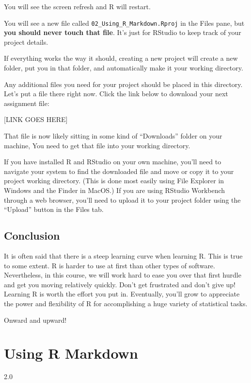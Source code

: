 \documentclass[
]{book}
\begin{document}
You will see the screen refresh and R will restart.

You will see a new file called \texttt{02\_Using\_R\_Markdown.Rproj} in the Files pane, but \textbf{you should never touch that file}. It's just for RStudio to keep track of your project details.

If everything works the way it should, creating a new project will create a new folder, put you in that folder, and automatically make it your working directory.

Any additional files you need for your project should be placed in this directory. Let's put a file there right now. Click the link below to download your next assignment file:

{[}LINK GOES HERE{]}

That file is now likely sitting in some kind of ``Downloads'' folder on your machine, You need to get that file into your working directory.

If you have installed R and RStudio on your own machine, you'll need to navigate your system to find the downloaded file and move or copy it to your project working directory. (This is done most easily using File Explorer in Windows and the Finder in MacOS.) If you are using RStudio Workbench through a web browser, you'll need to upload it to your project folder using the ``Upload'' button in the Files tab.

\hypertarget{intror-conclusion}{%
\section{Conclusion}\label{intror-conclusion}}

It is often said that there is a steep learning curve when learning R. This is true to some extent. R is harder to use at first than other types of software. Nevertheless, in this course, we will work hard to ease you over that first hurdle and get you moving relatively quickly. Don't get frustrated and don't give up! Learning R is worth the effort you put in. Eventually, you'll grow to appreciate the power and flexibility of R for accomplishing a huge variety of statistical tasks.

Onward and upward!

\hypertarget{rmark}{%
\chapter{Using R Markdown}\label{rmark}}

2.0
\end{document}
